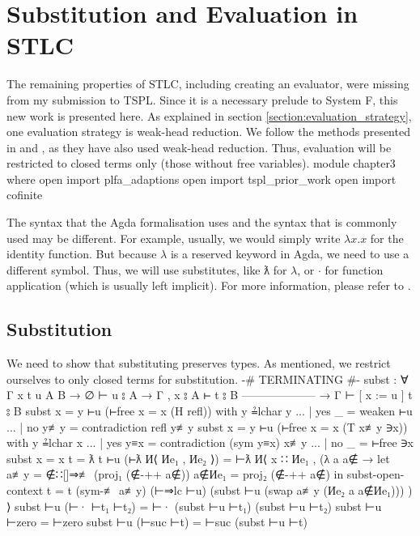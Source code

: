 \documentclass[logo,bsc,singlespacing,parskip,online]{infthesis}
\renewenvironment{code}{\mintedcopy[breaklines,breaksymbolleft=\;]{agda}}{\endmintedcopy}
\begin{document}
\chapter{Substitution and Evaluation in STLC}
The remaining properties of STLC, including creating an evaluator, were missing from my submission
to TSPL. Since it is a necessary prelude to System F, this new work is presented here. As explained
in section \ref{section:evaluation_strategy}, one evaluation strategy is weak-head reduction. We
follow the methods presented in \citet[chapter~Properties]{wadler_programming_2022} and
\citet[section~5]{chargueraud_locally_2012}, as they have also used weak-head reduction. Thus,
evaluation will be restricted to closed terms only (those without free variables).
\begin{code}
module chapter3 where
  open import plfa_adaptions
  open import tspl_prior_work
  open import cofinite
\end{code}

The syntax that the Agda formalisation uses and the syntax that is commonly used may be different.
For example, usually, we would simply write $\lambda x. x$ for the identity function. But because
$\lambda$ is a reserved keyword in Agda, we need to use a different symbol. Thus, we will use
substitutes, like ƛ for $\lambda$, or $\cdot$ for function application (which is usually left
implicit). For more information, please refer to \citet{wadler_programming_2022}.

\section{Substitution}
We need to show that substituting preserves types. As mentioned, we restrict ourselves to only
closed terms for substitution.
\begin{code}
  {-# TERMINATING #-}
  subst : ∀ {Γ x t u A B}
    → ∅ ⊢ u ⦂ A
    → Γ , x ⦂ A ⊢ t ⦂ B
      --------------------
    → Γ ⊢ [ x := u ] t ⦂ B
  subst {x = y} ⊢u (⊢free {x = x} (H refl)) with y ≟lchar y
  ... | yes _   = weaken ⊢u
  ... | no  y≢y = contradiction refl y≢y
  subst {x = y} ⊢u (⊢free {x = x} (T x≢y ∋x)) with y ≟lchar x
  ... | yes y≡x = contradiction (sym y≡x) x≢y
  ... | no  _   = ⊢free ∋x
  subst {x = x} {t = ƛ t} ⊢u (⊢ƛ И⟨ Иe₁ , Иe₂ ⟩) =
    ⊢ƛ И⟨ x ∷ Иe₁
        , (λ a {a∉} →
          let a≢y   = ∉∷[]⇒≢ (proj₁ (∉-++ a∉))
              a∉Иe₁ = proj₂ (∉-++ a∉)
          in subst-open-context
            {t = t}
            (sym-≢ a≢y)
            (⊢⇒lc ⊢u)
            (subst ⊢u (swap a≢y (Иe₂ a {a∉Иe₁}))) )
        ⟩
  subst ⊢u (⊢· ⊢t₁ ⊢t₂) = ⊢· (subst ⊢u ⊢t₁) (subst ⊢u ⊢t₂)
  subst ⊢u ⊢zero = ⊢zero
  subst ⊢u (⊢suc ⊢t) = ⊢suc (subst ⊢u ⊢t)
\end{code}
\end{document}
